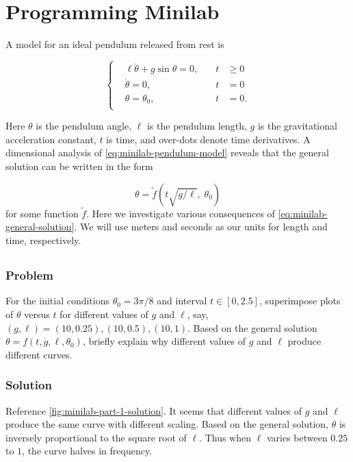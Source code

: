 \documentclass[12pt]{article}
\begin{document}
\section{Programming Minilab}
A model for an ideal pendulum released from rest is

\begin{equation}
  \label{eq:minilab-pendulum-model}
   \left\{
  \begin{aligned}
    &\ell\ddot{\theta}+g\sin\theta = 0, \quad &t &\ge0 \\
    &\dot{\theta} = 0, \quad &t &= 0 \\
    &\theta = \theta_0, \quad &t &= 0. \\
  \end{aligned}\right.
\end{equation}

Here $\theta$ is the pendulum angle, $\ell$ is the pendulum length, $g$ is the
gravitational acceleration constant, $t$ is time, and over-dots denote time
derivatives. A dimensional analysis of \cref{eq:minilab-pendulum-model} reveals
that the general solution can be written in the form

\begin{equation}
  \label{eq:minilab-general-solution}
  \theta = \tilde{f}(t\sqrt{g/\ell}, \;\theta_0)
\end{equation}
for some function $\tilde{f}$. Here we investigate various consequences of
\cref{eq:minilab-general-solution}. We will use meters and seconds as our units
for length and time, respectively.

\subsection{}
\label{sec:minilab-part-1}
  \subsubsection*{Problem}
  For the initial conditions $\theta_0=3\pi/8$ and interval $t\in[0,2.5]$,
  superimpose plots of $\theta$ versus $t$ for different values of $g$ and $\ell$,
  say, $(g,\ell)=(10, 0.25), (10, 0.5), (10, 1)$. Based on the general solution
  $\theta = f(t,g,\ell,\theta_0)$, briefly explain why different values of $g$ and
  $\ell$ produce different curves.

  \subsubsection*{Solution}
  Reference \cref{fig:minilab-part-1-solution}. It seems that different values of $g$ and
  $\ell$ produce the same curve with different scaling. Based on the general
  solution, $\theta$ is inversely proportional to the square root of $\ell$.
  Thus when $\ell$ varies between $0.25$ to $1$, the curve halves in frequency.
\end{document}
